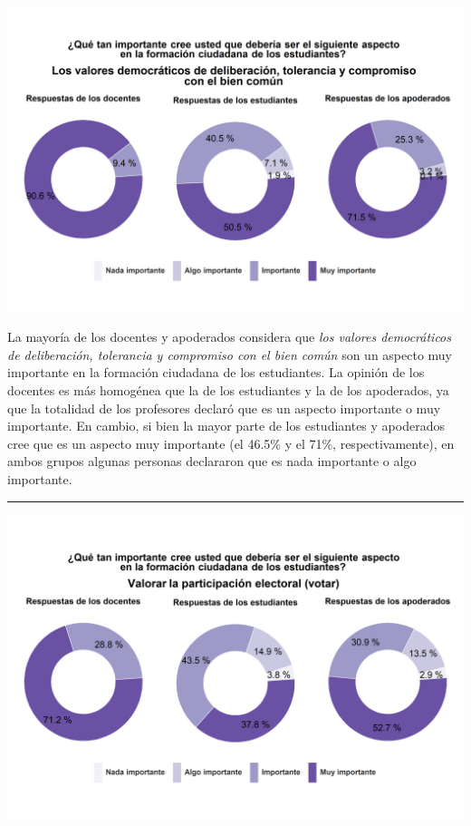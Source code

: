 \documentclass[
  14pt,
]{book}
\let\origfigure\figure
\let\endorigfigure\endfigure
\renewenvironment{figure}[1][2] {
  \expandafter\origfigure\expandafter[H]
} {
  \endorigfigure
}
\begin{document}
\begin{figure}[!ht]

{\centering \includegraphics[width=0.8\linewidth,]{images/graph_for_ciud2} 

}

\caption{Relevancia de los valores democráticos}\label{fig:unnamed-chunk-26}
\end{figure}

La mayoría de los docentes y apoderados considera que \emph{los valores democráticos de deliberación, tolerancia y compromiso con el bien común} son un aspecto muy importante en la formación ciudadana de los estudiantes. La opinión de los docentes es más homogénea que la de los estudiantes y la de los apoderados, ya que la totalidad de los profesores declaró que es un aspecto importante o muy importante. En cambio, si bien la mayor parte de los estudiantes y apoderados cree que es un aspecto muy importante (el 46.5\% y el 71\%, respectivamente), en ambos grupos algunas personas declararon que es nada importante o algo importante.

\begin{center}\rule{0.5\linewidth}{0.5pt}\end{center}

\begin{figure}[!ht]

{\centering \includegraphics[width=0.8\linewidth,]{images/graph_for_ciud3} 

}

\caption{Relevancia de la participación electoral}\label{fig:unnamed-chunk-27}
\end{figure}
\end{document}
